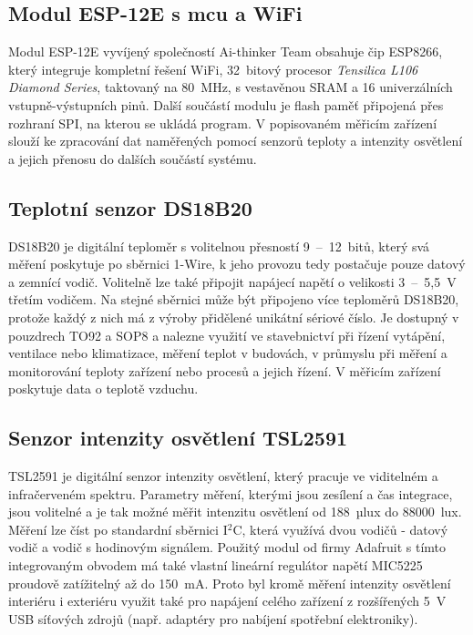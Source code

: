     \subsection{Modul ESP-12E s \acrshort{mcu} a WiFi}
        Modul ESP-12E vyvíjený společností Ai-thinker Team obsahuje čip ESP8266, který integruje kompletní řešení WiFi, 32~bitový procesor \emph{Tensilica L106 Diamond Series}, taktovaný na 80~MHz, s vestavěnou SRAM a 16 univerzálních vstupně-výstupních pinů. Další součástí modulu je flash paměť připojená přes rozhraní SPI, na kterou se ukládá program. \cite{ai-thinker:esp12e} V popisovaném měřicím zařízení slouží ke zpracování dat naměřených pomocí senzorů teploty a intenzity osvětlení a jejich přenosu do dalších součástí systému.
    \subsection{Teplotní senzor DS18B20}
        DS18B20 je digitální teploměr s volitelnou přesností 9~--~12~bitů, který svá měření poskytuje po sběrnici 1-Wire, k jeho provozu tedy postačuje pouze datový a zemnící vodič. Volitelně lze také připojit napájecí napětí o velikosti 3~--~5{,}5~V třetím vodičem. Na stejné sběrnici může být připojeno více teploměrů DS18B20, protože každý z nich má z výroby přidělené unikátní sériové číslo. Je dostupný v pouzdrech TO92 a SOP8 a nalezne využití ve stavebnictví při řízení vytápění, ventilace nebo klimatizace, měření teplot v budovách, v průmyslu při měření a monitorování teploty zařízení nebo procesů a jejich řízení. \cite{dallas:ds18b20} V měřicím zařízení poskytuje data o teplotě vzduchu.
    \subsection{Senzor intenzity osvětlení TSL2591}
        TSL2591 je digitální senzor intenzity osvětlení, který pracuje ve viditelném a infračerveném spektru. Parametry měření, kterými jsou zesílení a čas integrace, jsou volitelné a je tak možné měřit intenzitu osvětlení od 188~µlux do $88000$~lux. Měření lze číst po standardní sběrnici I$^2$C, která využívá dvou vodičů - datový vodič a vodič s hodinovým signálem. Použitý modul od firmy Adafruit s tímto integrovaným obvodem má také vlastní lineární regulátor napětí MIC5225 proudově zatížitelný až do 150~mA. \cite{adafruit:tsl2591} Proto byl kromě měření intenzity osvětlení interiéru i exteriéru využit také pro napájení celého zařízení z rozšířených 5~V USB síťových zdrojů (např. adaptéry pro nabíjení spotřební elektroniky).
